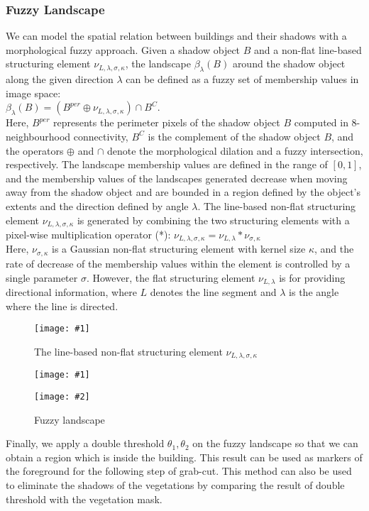\documentclass[runningheads]{llncs}
\newcommand{\insertTwoF}[5]{
  \begin{figure}[h!]
    \centering
    \begin{minipage}{#4\linewidth}
    \texttt{[image: \#1]}
    \end{minipage}
    \begin{minipage}{#4\linewidth}
    \texttt{[image: \#2]}
    \end{minipage}
      \caption{#3}
      \label{#5}
  \end{figure}  
}
\newcommand{\insertF}[4]{
  \begin{figure}[h!]
    \centering
    \begin{minipage}{#3\linewidth}
    \texttt{[image: \#1]}
    \end{minipage}  
      \caption{#2}
      \label{#4}
  \end{figure}  
}
\begin{document}
\subsubsection{Fuzzy Landscape}
We can model the spatial relation between buildings and their
shadows with a morphological fuzzy approach. Given a
shadow object $B$ and a non-flat line-based structuring element
$\nu_{L,\lambda,\sigma,\kappa}$, the landscape $\beta_{\lambda}(B)$ around the shadow object along the
given direction $\lambda$ can be defined as a fuzzy set of membership values in image space: \\
 $\beta_{\lambda}(B)=(B^{per}\oplus \nu_{L,\lambda,\sigma,\kappa})\cap B^C$. \\
Here, $B^{per}$ represents the perimeter pixels of the shadow object $B$ computed in 8-neighbourhood connectivity, $B^C$ is the complement of the shadow object $B$, and the operators $\oplus$ and $\cap$ denote the morphological dilation and a fuzzy intersection, respectively. The landscape membership values are defined in the range of $[0,1]$, and the membership values of the landscapes generated decrease when moving away from the shadow object and are bounded in a region defined by the object's extents and the direction defined by angle $\lambda$. The line-based non-flat
structuring element $\nu_{L,\lambda,\sigma,\kappa}$ is generated by combining the two structuring elements with a pixel-wise multiplication operator (*):
$\nu_{L,\lambda,\sigma,\kappa}=\nu_{L,\lambda}*\nu_{\sigma,\kappa}$ \\
Here, $\nu_{\sigma,\kappa}$ is a Gaussian non-flat structuring element with kernel size $\kappa$, and the rate of decrease of the membership values within the element is controlled by a single parameter $\sigma$. However, the flat
structuring element $\nu_{L,\lambda}$ is for providing directional information, where $L$ denotes the line segment and $\lambda$ is the angle where the line is directed.\\
\insertF{se_gaussian}{The line-based non-flat
structuring element $\nu_{L,\lambda,\sigma,\kappa}$}{0.3}{4}
\insertTwoF{local}{fuzzy_map_local}{Fuzzy landscape}{0.35}{5}
Finally, we apply a double threshold $\theta_1, \theta_2$ on the fuzzy landscape so that we can obtain a region which is inside the building. This result can be used as markers of the foreground for the following step of grab-cut. This method can also be used to eliminate the shadows of the vegetations by comparing the result of double threshold with the vegetation mask.\\
\end{document}

